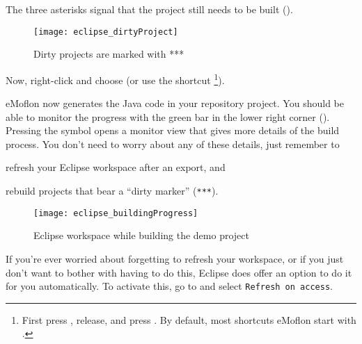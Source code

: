 \begin{stepbystep}
\item The three asterisks signal that the project still needs to be built ().
%
\begin{figure}[htbp]
    \centering
    \texttt{[image: eclipse\_dirtyProject]}
    \caption{Dirty projects are marked with ***} 
    \label{eclipse:dirty-project} 
\end{figure}
%
\item Now, right-click  and choose  (or use the shortcut \footnote{First press , release, and press .
By default, most shortcuts eMoflon start with .}).

eMoflon now generates the Java code in your repository project.
You should be able to monitor the progress with the green bar in the lower right corner ().
Pressing the symbol opens a monitor view that gives more details of the build process. 
You don't need to worry about any of these details, just remember to \begin{inparaenum}[(i.)]
\item refresh your Eclipse workspace after an export, and
\item rebuild projects that bear a \enquote{dirty marker} (\texttt{***}).
\end{inparaenum}
%
\begin{figure}[htbp]
    \centering
    \texttt{[image: eclipse\_buildingProgress]}
    \caption{Eclipse workspace while building the demo project} 
    \label{eclipse:build} 
\end{figure}
%
\item
If you're ever worried about forgetting to refresh your workspace, or if you just don't want to bother with having to do this,
Eclipse does offer an option to do it for you automatically. To activate this, go to  and select \texttt{Refresh on access}.

\end{stepbystep}